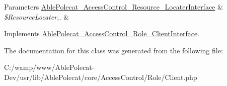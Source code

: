 \begin{DoxyParams}[1]{Parameters}
\hyperlink{interface_able_polecat___access_control___resource___locater_interface}{Able\+Polecat\+\_\+\+Access\+Control\+\_\+\+Resource\+\_\+\+Locater\+Interface} & {\em \$\+Resource\+Locater,.} & \\
\hline
\end{DoxyParams}


Implements \hyperlink{interface_able_polecat___access_control___role___client_interface_ac8f41684603c278abcc5055f8ffe0790}{Able\+Polecat\+\_\+\+Access\+Control\+\_\+\+Role\+\_\+\+Client\+Interface}.



The documentation for this class was generated from the following file\+:\begin{DoxyCompactItemize}
\item 
C\+:/wamp/www/\+Able\+Polecat-\/\+Dev/usr/lib/\+Able\+Polecat/core/\+Access\+Control/\+Role/Client.\+php\end{DoxyCompactItemize}
